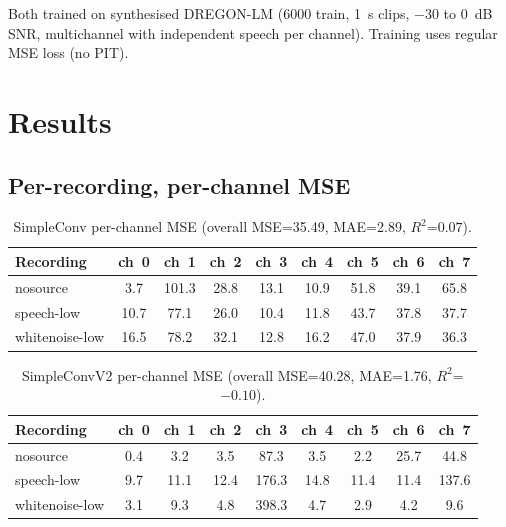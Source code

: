 \documentclass[11pt,a4paper]{article}
\newcommand{\rsq}{\ensuremath{R^{2}}}
\begin{document}
Both trained on synthesised DREGON-LM (6000 train, 1~s clips, $-30$ to $0$~dB SNR,
multichannel with independent speech per channel). Training uses regular MSE
loss (no PIT).

\section{Results}

\subsection{Per-recording, per-channel MSE}

\begin{table}[ht]
  \centering
  \caption{SimpleConv per-channel MSE (overall MSE=35.49, MAE=2.89, \rsq=$0.07$).}
  \label{tab:simpleconv}
  \small
  \begin{tabular}{lcccccccc}
    \toprule
    Recording & ch~0 & ch~1 & ch~2 & ch~3 & ch~4 & ch~5 & ch~6 & ch~7 \\
    \midrule
    nosource & 3.7 & 101.3 & 28.8 & 13.1 & 10.9 & 51.8 & 39.1 & 65.8 \\
    speech-low & 10.7 & 77.1 & 26.0 & 10.4 & 11.8 & 43.7 & 37.8 & 37.7 \\
    whitenoise-low & 16.5 & 78.2 & 32.1 & 12.8 & 16.2 & 47.0 & 37.9 & 36.3 \\
    \bottomrule
  \end{tabular}
\end{table}

\begin{table}[ht]
  \centering
  \caption{SimpleConvV2 per-channel MSE (overall MSE=40.28, MAE=1.76, \rsq=$-0.10$).}
  \label{tab:simpleconvv2}
  \small
  \begin{tabular}{lcccccccc}
    \toprule
    Recording & ch~0 & ch~1 & ch~2 & ch~3 & ch~4 & ch~5 & ch~6 & ch~7 \\
    \midrule
    nosource & 0.4 & 3.2 & 3.5 & 87.3 & 3.5 & 2.2 & 25.7 & 44.8 \\
    speech-low & 9.7 & 11.1 & 12.4 & 176.3 & 14.8 & 11.4 & 11.4 & 137.6 \\
    whitenoise-low & 3.1 & 9.3 & 4.8 & 398.3 & 4.7 & 2.9 & 4.2 & 9.6 \\
    \bottomrule
  \end{tabular}
\end{table}
\end{document}
